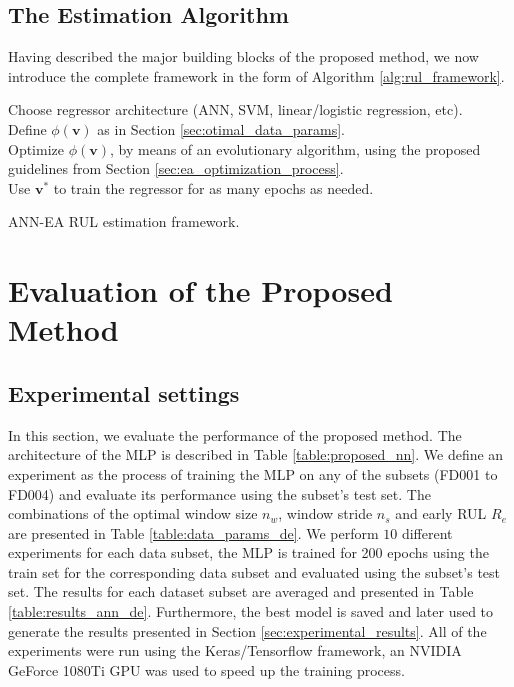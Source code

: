 \documentclass[preprint,12pt]{elsarticle}%
\begin{document}
\subsection{The Estimation Algorithm}

Having described the major building blocks of the proposed method, we now introduce the complete framework in the form of Algorithm \ref{alg:rul_framework}.

\begin{algorithm}[!htb]
\SetAlgoLined
{}


\BlankLine

Choose regressor architecture (ANN, SVM, linear/logistic regression, etc).\\
Define $\phi(\mathbf{v})$ as in Section \ref{sec:otimal_data_params}.\\
Optimize $\phi(\mathbf{v})$, by means of an evolutionary algorithm, using the proposed guidelines from Section \ref{sec:ea_optimization_process}.\\
Use $\mathbf{v}^*$ to train the regressor for as many epochs as needed.

\caption{ANN-EA RUL estimation framework.}
\label{alg:rul_framework}
\end{algorithm}


\section{Evaluation of the Proposed Method}

\label{sec:rul_eval}

\subsection{Experimental settings}

In this section, we evaluate the performance of the proposed method. The architecture of the MLP is described in Table \ref{table:proposed_nn}. We define an experiment as the process of training the MLP on any of the subsets (FD001 to FD004) and evaluate its performance using the subset's test set. The combinations of the optimal window size $n_{w}$, window stride $n_{s}$ and early RUL $R_{e}$ are presented in Table \ref{table:data_params_de}. We perform $10$ different experiments for each data subset, the MLP is trained for 200 epochs using the train set for the corresponding data subset and evaluated using the subset's test set. The results for each dataset subset are averaged and presented in Table \ref{table:results_ann_de}. Furthermore, the best model is saved and later used to generate the results presented in Section \ref{sec:experimental_results}. All of the experiments were run using the Keras/Tensorflow framework, an NVIDIA GeForce 1080Ti GPU was used to speed up the training process.
\end{document}
